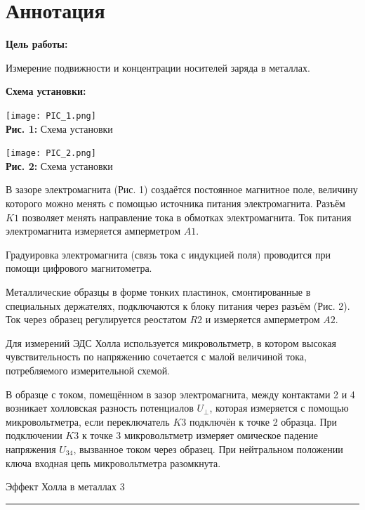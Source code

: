 \documentclass[12pt,a4paper]{scrartcl}
\begin{document}
	\section{Аннотация}
	
	\textbf{Цель работы: }
	
	Измерение подвижности и концентрации носителей заряда в металлах.
	
	\textbf{Схема установки:}
	\begin{center}
		\texttt{[image: PIC\_1.png]}
		\\\textbf{Рис. 1:} Схема установки
	\end{center}	

	\begin{center}
		\texttt{[image: PIC\_2.png]}
		\\\textbf{Рис. 2:} Схема установки
	\end{center}
		
	В зазоре электромагнита (Рис. 1) создаётся постоянное магнитное поле, величину которого можно менять с помощью источника питания электромагнита. Разъём $K1$ позволяет менять направление тока в обмотках электромагнита. Ток питания электромагнита измеряется амперметром $A1$.
	
	Градуировка электромагнита (связь тока с индукцией поля) проводится при помощи цифрового магнитометра.
	
	Металлические образцы в форме тонких пластинок, смонтированные в специальных держателях, подключаются к блоку питания через разъём (Рис. 2). Ток через образец регулируется реостатом $R2$ и измеряется
	амперметром $A2$.
	
	Для измерений ЭДС Холла используется микровольтметр, в котором высокая чувствительность по напряжению сочетается с малой величиной тока, потребляемого измерительной схемой.
	
	В образце с током, помещённом в зазор электромагнита, между контактами 2 и 4 возникает холловская разность потенциалов $U_\perp$, которая измеряется с помощью микровольтметра, если переключатель $K3$ подключён к точке 2 образца. При подключении $K3$ к точке 3 микровольтметр измеряет омическое падение напряжения $U_{34}$, вызванное током через образец. При нейтральном положении ключа входная цепь микровольтметра разомкнута.	

	\newpage


	\begin{flushleft}
		\footnotesize{Эффект Холла в металлах} \hspace{\fill} \footnotesize{3}
		\\[-0.3cm]\noindent\rule{\textwidth}{0.3pt}
	\end{flushleft}		
		
\end{document}
